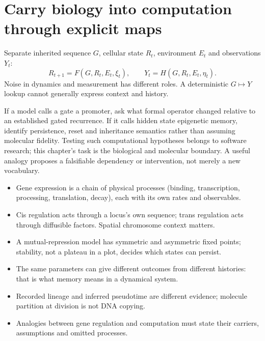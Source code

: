 \section{Carry biology into computation through explicit maps}
Separate inherited sequence $G$, cellular state $R_t$, environment $E_t$ and
observations $Y_t$:
\[
 R_{t+1}=F(G,R_t,E_t,\xi_t),\qquad Y_t=H(G,R_t,E_t,\eta_t).
\]
Noise in dynamics and measurement has different roles. A deterministic
$G\mapsto Y$ lookup cannot generally express context and history.

If a model calls a gate a promoter, ask what formal operator changed relative to
an established gated recurrence. If it calls hidden state epigenetic memory,
identify persistence, reset and inheritance semantics rather than assuming molecular
fidelity. Testing such computational hypotheses belongs to software research; this
chapter's task is the biological and molecular boundary. A useful analogy proposes a falsifiable
dependency or intervention, not merely a new vocabulary.

\begin{KeyIdeas}
\begin{itemize}\setlength{\itemsep}{2pt}
\item Gene expression is a chain of physical processes (binding, transcription,
processing, translation, decay), each with its own rates and observables.
\item Cis regulation acts through a locus's own sequence; trans regulation acts
through diffusible factors. Spatial chromosome context matters.
\item A mutual-repression model has symmetric and asymmetric fixed points;
stability, not a plateau in a plot, decides which states can persist.
\item The same parameters can give different outcomes from different histories:
that is what memory means in a dynamical system.
\item Recorded lineage and inferred pseudotime are different evidence; molecule
partition at division is not DNA copying.
\item Analogies between gene regulation and computation must state their
carriers, assumptions and omitted processes.
\end{itemize}
\end{KeyIdeas}

